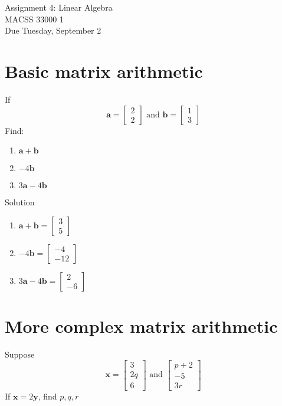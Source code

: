 \documentclass[12pt]{article}
\begin{document}
	\begin{center}
		Assignment 4: Linear Algebra\\
        MACSS 33000 1 \\
		Due Tuesday, September 2 \\
	\end{center}


 
\section{Basic matrix arithmetic}
If
\[ \mathbf{a} = \begin{bmatrix}
    2 \\ 2
\end{bmatrix} \text{ and }\mathbf{b} = \begin{bmatrix}
    1 \\ 3
\end{bmatrix} \]
Find:
\begin{enumerate}
    \item $\mathbf{a}+\mathbf{b}$
    \item $-4\mathbf{b}$
    \item $3\mathbf{a} - 4\mathbf{b}$
\end{enumerate}
Solution
\begin{enumerate}
    \item $\mathbf{a}+\mathbf{b} = \begin{bmatrix}    3 \\ 5\end{bmatrix} $
    \item $-4\mathbf{b} =  \begin{bmatrix}    -4 \\ -12 \end{bmatrix}$
    \item $3\mathbf{a} - 4\mathbf{b} =  \begin{bmatrix}    2 \\ -6\end{bmatrix}$
\end{enumerate}

\section{More complex matrix arithmetic}
Suppose
\[ \mathbf{x} =  \begin{bmatrix}    3 \\ 2q \\ 6 \end{bmatrix} \text{ and } \begin{bmatrix}
    p+2 \\-5 \\ 3r
\end{bmatrix} \]
If $\mathbf{x} = 2\mathbf{y}$, find $p,q,r$
\end{document}

